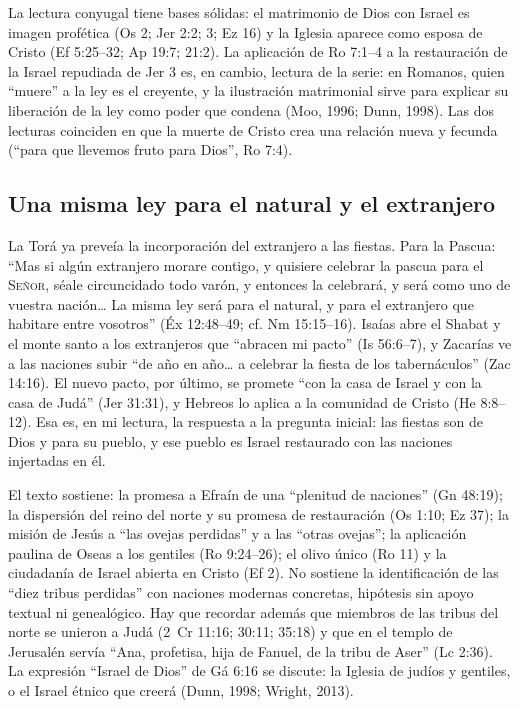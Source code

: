 \documentclass[11pt,letterpaper]{article}
\newcommand{\SENOR}{\textsc{Señor}}
\begin{document}
\begin{nota}[Precisión]
La lectura conyugal tiene bases sólidas: el matrimonio de Dios con Israel es imagen profética (Os 2; Jer 2:2; 3; Ez 16) y la Iglesia aparece como esposa de Cristo (Ef 5:25--32; Ap 19:7; 21:2). La aplicación de Ro 7:1--4 a la restauración de la Israel repudiada de Jer 3 es, en cambio, lectura de la serie: en Romanos, quien ``muere'' a la ley es el creyente, y la ilustración matrimonial sirve para explicar su liberación de la ley como poder que condena (Moo, 1996; Dunn, 1998). Las dos lecturas coinciden en que la muerte de Cristo crea una relación nueva y fecunda (``para que llevemos fruto para Dios'', Ro 7:4).
\end{nota}

\subsection{Una misma ley para el natural y el extranjero}
La Torá ya preveía la incorporación del extranjero a las fiestas. Para la Pascua: ``Mas si algún extranjero morare contigo, y quisiere celebrar la pascua para el \SENOR, séale circuncidado todo varón, y entonces la celebrará, y será como uno de vuestra nación\ldots{} La misma ley será para el natural, y para el extranjero que habitare entre vosotros'' (Éx 12:48--49; cf. Nm 15:15--16). Isaías abre el Shabat y el monte santo a los extranjeros que ``abracen mi pacto'' (Is 56:6--7), y Zacarías ve a las naciones subir ``de año en año\ldots{} a celebrar la fiesta de los tabernáculos'' (Zac 14:16). El nuevo pacto, por último, se promete ``con la casa de Israel y con la casa de Judá'' (Jer 31:31), y Hebreos lo aplica a la comunidad de Cristo (He 8:8--12). Esa es, en mi lectura, la respuesta a la pregunta inicial: las fiestas son de Dios y para su pueblo, y ese pueblo es Israel restaurado con las naciones injertadas en él.

\begin{nota}[Precisión]
El texto sostiene: la promesa a Efraín de una ``plenitud de naciones'' (Gn 48:19); la dispersión del reino del norte y su promesa de restauración (Os 1:10; Ez 37); la misión de Jesús a ``las ovejas perdidas'' y a las ``otras ovejas''; la aplicación paulina de Oseas a los gentiles (Ro 9:24--26); el olivo único (Ro 11) y la ciudadanía de Israel abierta en Cristo (Ef 2). No sostiene la identificación de las ``diez tribus perdidas'' con naciones modernas concretas, hipótesis sin apoyo textual ni genealógico. Hay que recordar además que miembros de las tribus del norte se unieron a Judá (2~Cr 11:16; 30:11; 35:18) y que en el templo de Jerusalén servía ``Ana, profetisa, hija de Fanuel, de la tribu de Aser'' (Lc 2:36). La expresión ``Israel de Dios'' de Gá 6:16 se discute: la Iglesia de judíos y gentiles, o el Israel étnico que creerá (Dunn, 1998; Wright, 2013).
\end{nota}
\end{document}
